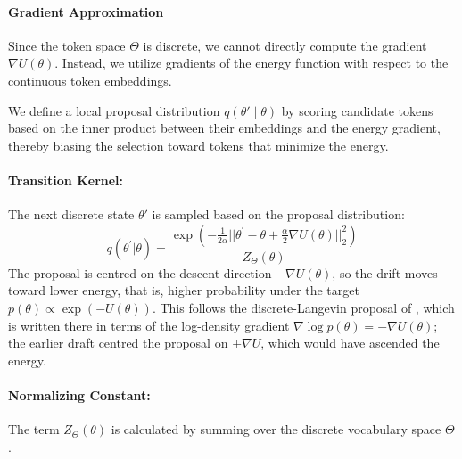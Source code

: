 \documentclass[11pt]{article}
\begin{document}

\paragraph{Gradient Approximation}
Since the token space $\Theta$ is discrete, we cannot directly compute the gradient $\nabla U(\theta)$. Instead, we utilize gradients of the energy function with respect to the continuous token embeddings. 

We define a local proposal distribution $q(\theta' \mid \theta)$ by scoring candidate tokens based on the inner product between their embeddings and the energy gradient, thereby biasing the selection toward tokens that minimize the energy.

\paragraph{Transition Kernel:} 
The next discrete state $\theta'$ is sampled based on the proposal distribution:
\[
q(\theta^{\prime}|\theta)=\frac{\exp(-\frac{1}{2\alpha}||\theta^{\prime}-\theta+\frac{\alpha}{2}\nabla U(\theta)||_{2}^{2})}{Z_{\Theta}(\theta)}
\]
The proposal is centred on the descent direction $-\nabla U(\theta)$, so the drift moves toward lower energy, that is, higher probability under the target $p(\theta)\propto\exp(-U(\theta))$. This follows the discrete-Langevin proposal of \cite{zhang2022langevinlikesamplerdiscretedistributions}, which is written there in terms of the log-density gradient $\nabla\log p(\theta)=-\nabla U(\theta)$; the earlier draft centred the proposal on $+\nabla U$, which would have ascended the energy.

\paragraph{Normalizing Constant:} 
The term $Z_{\Theta}(\theta)$ is calculated by summing over the discrete vocabulary space $\Theta$.
\end{document}
